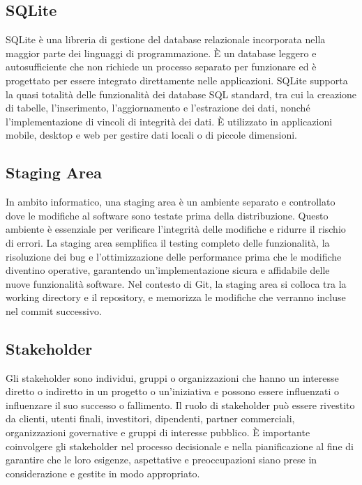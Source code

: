 \vspace{2em}
\subsection*{SQLite}
\par SQLite è una libreria di gestione del database relazionale incorporata nella maggior parte dei linguaggi di programmazione. È un database leggero e autosufficiente che non richiede un processo separato per funzionare ed è progettato per essere integrato direttamente nelle applicazioni. SQLite supporta la quasi totalità delle funzionalità dei database SQL standard, tra cui la creazione di tabelle, l'inserimento, l'aggiornamento e l'estrazione dei dati, nonché l'implementazione di vincoli di integrità dei dati. È utilizzato in applicazioni mobile, desktop e web per gestire dati locali o di piccole dimensioni.

\vspace{2em}
\subsection*{Staging Area}
\par In ambito informatico, una staging area è un ambiente separato e controllato dove le modifiche al software sono testate prima della distribuzione. Questo ambiente è essenziale per verificare l'integrità delle modifiche e ridurre il rischio di errori. La staging area semplifica il testing completo delle funzionalità, la risoluzione dei bug e l'ottimizzazione delle performance prima che le modifiche diventino operative, garantendo un'implementazione sicura e affidabile delle nuove funzionalità software. Nel contesto di Git, la staging area si colloca tra la working directory e il repository, e memorizza le modifiche che verranno incluse nel commit successivo.

\vspace{2em}
\subsection*{Stakeholder}
\par Gli stakeholder sono individui, gruppi o organizzazioni che hanno un interesse diretto o indiretto in un progetto o un'iniziativa e possono essere influenzati o influenzare il suo successo o fallimento. Il ruolo di stakeholder può essere rivestito da clienti, utenti finali, investitori, dipendenti, partner commerciali, organizzazioni governative e gruppi di interesse pubblico. È importante coinvolgere gli stakeholder nel processo decisionale e nella pianificazione al fine di garantire che le loro esigenze, aspettative e preoccupazioni siano prese in considerazione e gestite in modo appropriato.

